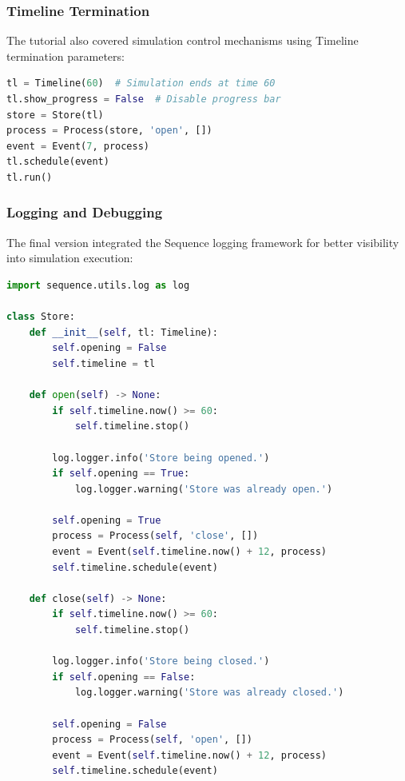 \subsubsection{Timeline Termination}

The tutorial also covered simulation control mechanisms using Timeline termination parameters:

\begin{lstlisting}[language=Python, breaklines=true]
tl = Timeline(60)  # Simulation ends at time 60
tl.show_progress = False  # Disable progress bar
store = Store(tl)
process = Process(store, 'open', [])
event = Event(7, process)
tl.schedule(event)
tl.run()
\end{lstlisting}

\subsubsection{Logging and Debugging}

The final version integrated the Sequence logging framework for better visibility into simulation execution:

\begin{lstlisting}[language=Python, breaklines=true]
import sequence.utils.log as log

class Store:
    def __init__(self, tl: Timeline):
        self.opening = False
        self.timeline = tl

    def open(self) -> None:
        if self.timeline.now() >= 60:
            self.timeline.stop()
        
        log.logger.info('Store being opened.')
        if self.opening == True:
            log.logger.warning('Store was already open.')

        self.opening = True
        process = Process(self, 'close', [])
        event = Event(self.timeline.now() + 12, process)
        self.timeline.schedule(event)

    def close(self) -> None:
        if self.timeline.now() >= 60:
            self.timeline.stop()

        log.logger.info('Store being closed.')
        if self.opening == False:
            log.logger.warning('Store was already closed.')

        self.opening = False
        process = Process(self, 'open', [])
        event = Event(self.timeline.now() + 12, process)
        self.timeline.schedule(event)
\end{lstlisting}

